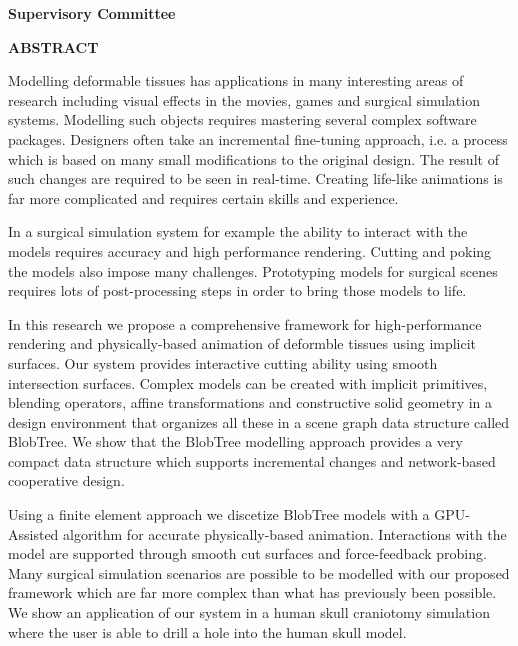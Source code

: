 \pagebreak
\newpage
{}

\noindent \textbf{Supervisory Committee}
\tpbreak
\panel

\begin{center}
\textbf{ABSTRACT}
\end{center}
Modelling deformable tissues has applications in many interesting areas of research including visual effects in the movies, games and
surgical simulation systems. Modelling such objects requires mastering several complex software packages.  Designers often take an incremental 
fine-tuning approach, i.e. a process which is based on many small modifications to the original design. The result of such 
changes are required to be seen in real-time. Creating life-like animations is far more complicated and requires certain skills and experience. 

In a surgical simulation system for example the ability to interact with the models requires accuracy and high performance rendering. 
Cutting and poking the models also impose many challenges. Prototyping models for surgical scenes requires lots of post-processing steps 
in order to bring those models to life.

In this research we propose a comprehensive framework for high-performance rendering and physically-based animation of deformble tissues
using implicit surfaces. Our system provides interactive cutting ability using smooth intersection surfaces. 
Complex models can be created with implicit primitives, blending operators, affine transformations and constructive solid geometry 
in a design environment that organizes all these in a scene graph data structure called BlobTree. We show that the BlobTree modelling approach
provides a very compact data structure which supports incremental changes and network-based cooperative design. 

Using a finite element approach we discetize BlobTree models with a GPU-Assisted algorithm for accurate physically-based animation. Interactions with the
model are supported through smooth cut surfaces and force-feedback probing. Many surgical simulation scenarios are possible to be modelled with 
our proposed framework which are far more complex than what has previously been possible. We show an application of our system in a human skull 
craniotomy simulation where the user is able to drill a hole into the human skull model. 

\pagebreak


